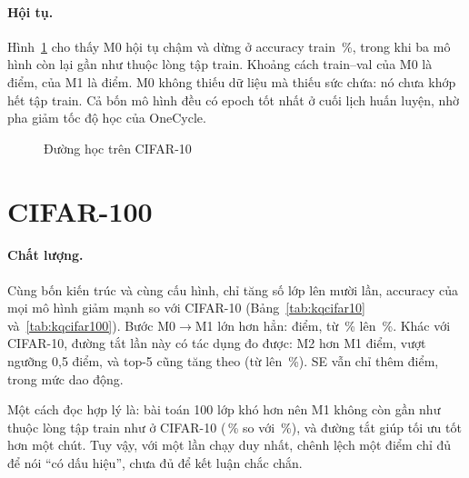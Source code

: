 \paragraph{Hội tụ.} Hình~\ref{fig:hoccifar10} cho thấy M0 hội tụ chậm và dừng ở accuracy train
\,\%, trong khi ba mô hình còn lại gần như thuộc lòng tập train. Khoảng cách
train--val của M0 là  điểm, của M1 là  điểm. M0 không
thiếu dữ liệu mà thiếu sức chứa: nó chưa khớp hết tập train. Cả bốn mô hình đều có epoch tốt nhất ở cuối lịch huấn luyện,
nhờ pha giảm tốc độ học của OneCycle.

\begin{figure}[H]
  \centering
  \caption{Đường học trên CIFAR-10}
  \label{fig:hoccifar10}
\end{figure}

\section{CIFAR-100}

\begin{table}[H]
  \centering
  \caption{Kết quả trên tập test CIFAR-100 ( ảnh, 100 lớp)}
  \label{tab:kqcifar100}
  \small
\end{table}

\paragraph{Chất lượng.} Cùng bốn kiến trúc và cùng cấu hình, chỉ tăng số lớp lên mười lần, accuracy của mọi mô hình giảm
mạnh so với CIFAR-10 (Bảng~\ref{tab:kqcifar10} và~\ref{tab:kqcifar100}). Bước M0$\to$M1 lớn hơn hẳn:  điểm, từ
\,\% lên \,\%. Khác với CIFAR-10, đường tắt lần này có tác dụng
đo được: M2 hơn M1  điểm, vượt ngưỡng 0,5 điểm, và top-5 cũng tăng theo (từ
 lên \,\%). SE vẫn chỉ thêm
 điểm, trong mức dao động.

Một cách đọc hợp lý là: bài toán 100 lớp khó hơn nên M1 không còn gần như thuộc lòng tập train như ở CIFAR-10
(\,\% so với \,\%), và đường tắt giúp
tối ưu tốt hơn một chút. Tuy vậy, với một lần chạy duy nhất, chênh lệch một điểm chỉ đủ để nói ``có dấu hiệu'', chưa đủ để
kết luận chắc chắn.

